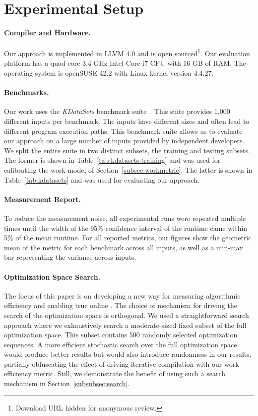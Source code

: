 \section{Experimental Setup}\label{sec:setup}

\paragraph{Compiler and Hardware.}
Our approach is implemented in LLVM 4.0 and is open sourced\footnote{Download URL hidden for anonymous review.}. Our evaluation platform has
a quad-core 3.4 GHz Intel Core i7 CPU with 16 GB of RAM. The operating system is openSUSE 42.2 with Linux kernel version 4.4.27.

\paragraph{Benchmarks.}
Our work uses the \textit{KDataSets} benchmark suite~\cite{chen10,chen12a}. This suite provides 1,000 different inputs per benchmark. The
inputs have different sizes and often lead to different program execution paths. This benchmark suite allows us to evaluate our approach on
a large number of inputs provided by independent developers. We split the entire suite in two distinct subsets, the training and testing
subsets. The former is shown in Table~\ref{tab:kdatasets:training} and was used for calibrating the work model of
Section~\ref{subsec:workmetric}. The latter is shown in Table~\ref{tab:kdatasets} and was used for evaluating our approach.



\paragraph{Measurement Report.}
To reduce the measurement noise, all experimental runs were repeated multiple times until the width of the 95\% confidence interval of the
runtime came within 5\% of the mean runtime. For all reported metrics, our figures show the geometric mean of the metric for each benchmark
across all inputs, as well as a min-max bar representing the variance across inputs.

\paragraph{Optimization Space Search.}

The focus of this paper is on developing a new way for measuring algorithmic efficiency and enabling true online {\itercomp}. The choice of
mechanism for driving the search of the optimization space is orthogonal. We used a straightforward search approach where we exhaustively
search a moderate-sized fixed subset of the full optimization space. This subset contains 500 randomly selected optimization sequences. A
more efficient stochastic search over the full optimization space would produce better results but would also introduce randomness in our
results, partially obfuscating the effect of driving iterative compilation with our work efficiency metric. Still, we demonstrate the
benefit of using such a search mechanism in Section~\ref{subsubsec:search}.


